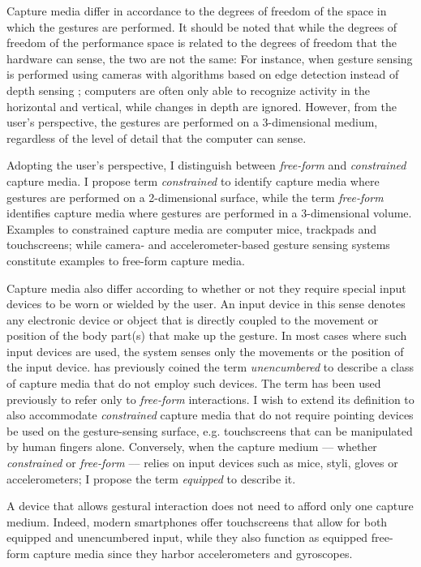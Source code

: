 Capture media differ in accordance to the degrees of freedom of the space in which the gestures are performed. It should be noted that while the degrees of freedom of the performance space is related to the degrees of freedom that the hardware can sense, the two are not the same: For instance, when gesture sensing is performed using cameras with algorithms based on edge detection instead of depth sensing \parencite{Moeslund:2001, Moeslund:2006}; computers are often only able to recognize activity in the horizontal and vertical, while changes in depth are ignored. However, from the user’s perspective, the gestures are performed on a 3-dimensional medium, regardless of the level of detail that the computer can sense.

Adopting the user’s perspective, I distinguish between \emph{free-form} and \emph{constrained} capture media. I propose term \emph{constrained} to identify capture media where gestures are performed on a 2-dimensional surface, while the term \emph{free-form} identifies capture media where gestures are performed in a 3-dimensional volume. Examples to constrained capture media are computer mice, trackpads and touchscreens; while camera- and accelerometer-based gesture sensing systems constitute examples to free-form capture media.

Capture media also differ according to whether or not they require special input devices to be worn or wielded by the user. An input device in this sense denotes any electronic device or object that is directly coupled to the movement or position of the body part(s) that make up the gesture. In most cases where such input devices are used, the system senses only the movements or the position of the input device. \textcite{Quek:1996} has previously coined the term \emph{unencumbered} to describe a class of capture media that do not employ such devices. The term has been used previously to refer only to \emph{free-form} interactions. I wish to extend its definition to also accommodate \emph{constrained} capture media that do not require pointing devices be used on the gesture-sensing surface, e.g. touchscreens that can be manipulated by human fingers alone.  Conversely, when the capture medium --– whether \emph{constrained} or \emph{free-form} –-- relies on input devices such as mice, styli, gloves or accelerometers; I propose the term \emph{equipped} to describe it.

A device that allows gestural interaction does not need to afford only one capture medium. Indeed, modern smartphones offer touchscreens that allow for both equipped and unencumbered input, while they also function as equipped free-form capture media since they harbor accelerometers and gyroscopes.

